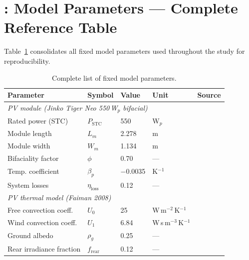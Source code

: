 \bigskip



\section{: Model Parameters — Complete Reference Table}
\label{app:params}

\hspace{1cm}Table~\ref{tab:allparams} consolidates all fixed model
parameters used throughout the study for reproducibility.

\begin{table}[H]
	\caption{Complete list of fixed model parameters.}
	\label{tab:allparams}
	\centering
	\small
	\begin{tabular}{lllll}
		\toprule
		\textbf{Parameter} & \textbf{Symbol} & \textbf{Value}
		& \textbf{Unit} & \textbf{Source} \\
		\midrule
		\multicolumn{5}{l}{\textit{PV module (Jinko Tiger Neo 550\,W$_p$
				bifacial)}} \\
		Rated power (STC)        & $P_{\text{STC}}$     & 550
		& W$_p$                & \citet{jinko} \\
		Module length            & $L_m$                & 2.278
		& m                    & \citet{jinko} \\
		Module width             & $W_m$                & 1.134
		& m                    & \citet{jinko} \\
		Bifaciality factor       & $\phi$               & 0.70
		& ---                  & \citet{jinko} \\
		Temp. coefficient        & $\beta_p$            & $-$0.0035
		& K$^{-1}$             & \citet{jinko} \\
		System losses            & $\eta_{\text{loss}}$ & 0.12
		& ---                  & \citet{jordan2013} \\
		\midrule
		\multicolumn{5}{l}{\textit{PV thermal model (Faiman 2008)}} \\
		Free convection coeff.   & $U_0$                & 25
		& W\,m$^{-2}$\,K$^{-1}$  & \citet{faiman2008} \\
		Wind convection coeff.   & $U_1$                & 6.84
		& W\,s\,m$^{-3}$\,K$^{-1}$ & \citet{faiman2008} \\
		Ground albedo            & $\rho_g$             & 0.25
		& ---                  & \citet{monteith2008} \\
		Rear irradiance fraction & $f_{\text{rear}}$    & 0.12
		& ---                  & \citet{gorjian2022} \\

\end{tabular}
\end{table}
